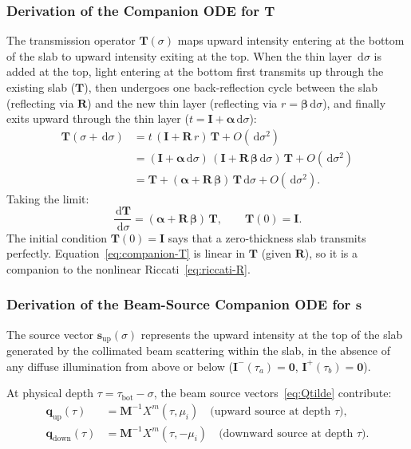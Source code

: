 \documentclass[11pt,a4paper]{article}
\newcommand{\vect}[1]{\bm{#1}}
\newcommand{\mat}[1]{\mathbf{#1}}
\newcommand{\tbot}{\tau_{\mathrm{bot}}}
\newcommand{\dd}{\,\mathrm{d}}
\theoremstyle{definition}
\begin{document}
\subsubsection{Derivation of the Companion ODE for \texorpdfstring{$\mat{T}$}{T}}

The transmission operator $\mat{T}(\sigma)$ maps upward intensity
entering at the bottom of the slab to upward intensity exiting at the
top.  When the thin layer $\dd\sigma$ is added at the top, light entering at
the bottom first transmits up through the existing slab ($\mat{T}$), then
undergoes one back-reflection cycle between the slab (reflecting via
$\mat{R}$) and the new thin layer (reflecting via $r = \mat{\beta}\dd\sigma$),
and finally exits upward through the thin layer
($t = \mat{I} + \mat{\alpha}\dd\sigma$):
\begin{align}
  \mat{T}(\sigma + \dd\sigma)
  &= t\,(\mat{I} + \mat{R}\,r)\,\mat{T} + O(\dd\sigma^2) \nonumber \\
  &= (\mat{I} + \mat{\alpha}\dd\sigma)\,
     (\mat{I} + \mat{R}\,\mat{\beta}\dd\sigma)\,\mat{T}
     + O(\dd\sigma^2) \nonumber \\
  &= \mat{T} + (\mat{\alpha} + \mat{R}\,\mat{\beta})\,\mat{T}\dd\sigma
     + O(\dd\sigma^2).
\end{align}
Taking the limit:
\begin{equation}\label{eq:companion-T}
  \boxed{
    \frac{\dd\mat{T}}{\dd\sigma}
    = (\mat{\alpha} + \mat{R}\,\mat{\beta})\,\mat{T},
    \qquad \mat{T}(0) = \mat{I}.
  }
\end{equation}
The initial condition $\mat{T}(0) = \mat{I}$ says that a zero-thickness
slab transmits perfectly.  Equation~\eqref{eq:companion-T} is linear
in $\mat{T}$ (given $\mat{R}$), so it is a companion to the nonlinear
Riccati~\eqref{eq:riccati-R}.

\subsubsection{Derivation of the Beam-Source Companion ODE for \texorpdfstring{$\vect{s}$}{s}}

The source vector $\vect{s}_{\mathrm{up}}(\sigma)$ represents the upward
intensity at the top of the slab generated by the collimated beam
scattering within the slab, in the absence of any diffuse illumination
from above or below ($\vect{I}^-(\tau_a) = \vect{0}$,
$\vect{I}^+(\tau_b) = \vect{0}$).

At physical depth $\tau = \tbot - \sigma$, the beam source
vectors~\eqref{eq:Qtilde} contribute:
\begin{align}\label{eq:q-up-down}
  \vect{q}_{\mathrm{up}}(\tau) &= \mat{M}^{-1} X^m(\tau, \mu_i)
    \quad\text{(upward source at depth $\tau$)}, \\
  \vect{q}_{\mathrm{down}}(\tau) &= \mat{M}^{-1} X^m(\tau, -\mu_i)
    \quad\text{(downward source at depth $\tau$)}.
\end{align}
\end{document}

